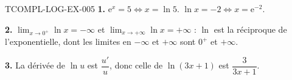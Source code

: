 \begin{corrige}{TCOMPL-LOG-EX-005}
\textbf{1.} $\mathrm{e}^x=5\iff x=\ln5$. $\ln x=-2\iff x=\mathrm{e}^{-2}$.

\textbf{2.} $\displaystyle\lim_{x\to0^+}\ln x=-\infty$ et
$\displaystyle\lim_{x\to+\infty}\ln x=+\infty$ : $\ln$ est la réciproque de
l'exponentielle, dont les limites en $-\infty$ et $+\infty$ sont $0^+$ et
$+\infty$.

\textbf{3.} La dérivée de $\ln u$ est $\dfrac{u'}{u}$, donc celle de
$\ln(3x+1)$ est $\dfrac{3}{3x+1}$.
\end{corrige}
